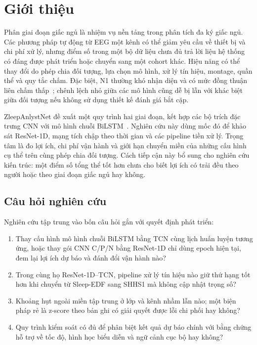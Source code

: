 \section{Giới thiệu}
\label{sec:introduction}

Phân giai đoạn giấc ngủ là nhiệm vụ nền tảng trong phân tích đa ký giấc ngủ. Các phương pháp tự động từ EEG một kênh có thể giảm yêu cầu về thiết bị và chi phí xử lý, nhưng điểm số trong một bộ dữ liệu chưa đủ trả lời liệu hệ thống có đáng được phát triển hoặc chuyển sang một cohort khác. Hiệu năng có thể thay đổi do phép chia đối tượng, lựa chọn mô hình, xử lý tín hiệu, montage, quần thể và quy tắc chấm. Đặc biệt, N1 thường khó nhận diện và có mức đồng thuận liên chấm thấp~\cite{rosenberg2013aasm}; chênh lệch nhỏ giữa các mô hình cũng dễ bị lẫn với khác biệt giữa đối tượng nếu không sử dụng thiết kế đánh giá bắt cặp.

ZleepAnlystNet đề xuất một quy trình hai giai đoạn, kết hợp các bộ trích đặc trưng CNN với mô hình chuỗi BiLSTM~\cite{jadhav2024zleepanlystnet}. Nghiên cứu này dùng mốc đó để khảo sát ResNet-1D, mạng tích chập theo thời gian và các pipeline tiền xử lý. Trọng tâm là đo lợi ích, chi phí vận hành và giới hạn chuyển miền của những cấu hình cụ thể trên cùng phép chia đối tượng. Cách tiếp cận này bổ sung cho nghiên cứu kiến trúc: một điểm số tổng thể tốt hơn chưa cho biết lợi ích có trải đều theo người hoặc theo giai đoạn giấc ngủ hay không.

\subsection{Câu hỏi nghiên cứu}

Nghiên cứu tập trung vào bốn câu hỏi gắn với quyết định phát triển:

\begin{enumerate}
  \item Thay cấu hình mô hình chuỗi BiLSTM bằng TCN cùng lịch huấn luyện tương ứng, hoặc thay gói CNN C/P/N bằng ResNet-1D chỉ dùng epoch hiện tại, đem lại lợi ích dự báo và đánh đổi vận hành nào?
  \item Trong cùng họ ResNet-1D--TCN, pipeline xử lý tín hiệu nào giữ thứ hạng tốt hơn khi chuyển từ Sleep-EDF sang SHHS1 mà không cập nhật trọng số?
  \item Khoảng hụt ngoài miền tập trung ở lớp và kênh nhầm lẫn nào; một biện pháp rẻ là z-score theo bản ghi có giải quyết được lỗi chi phối hay không?
  \item Quy trình kiểm soát có đủ để phân biệt kết quả dự báo chính với bằng chứng hỗ trợ về tốc độ, hình học biểu diễn và ngữ cảnh cục bộ hay không?
\end{enumerate}

